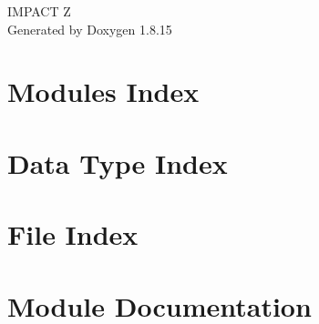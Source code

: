 \let\mypdfximage\pdfximage\def\pdfximage{\immediate\mypdfximage}\documentclass[twoside]{book}
\newcommand{\+}{\discretionary{\mbox{\scriptsize$\hookleftarrow$}}{}{}}
\newcommand{\clearemptydoublepage}{%
  \newpage{\pagestyle{empty}\cleardoublepage}%
}
\begin{document}
\hypersetup{pageanchor=false,
             bookmarksnumbered=true,
             pdfencoding=unicode
            }
\begin{titlepage}
\vspace*{7cm}
\begin{center}%
{\Large I\+M\+P\+A\+CT Z }\\
\vspace*{1cm}
{\large Generated by Doxygen 1.8.15}\\
\end{center}
\end{titlepage}
\clearemptydoublepage
{}
\tableofcontents
\clearemptydoublepage
{}
\hypersetup{pageanchor=true}

\chapter{Modules Index}

\chapter{Data Type Index}

\chapter{File Index}

\chapter{Module Documentation}































\end{document}
